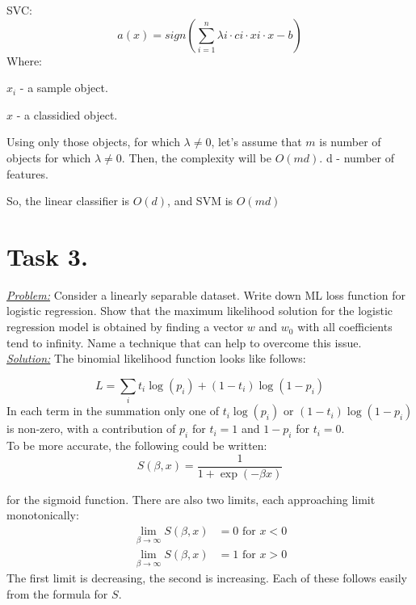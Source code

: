\documentclass[a4paper,12pt]{article}
\begin{document}
SVC:
\[
    a(x) = sign(\sum\limits_{i=1}^{n} \lambda i\cdot ci\cdot xi\cdot x - b)
\]
Where:

\(x_i\) - a sample object.

\(x\) - a classidied object.

Using only those objects, for which \(\lambda \neq 0\), let's assume that \(m\) is number of objects for which \(\lambda \neq 0\). Then, the complexity will be \(O(md)\). d - number of features.

So, the linear classifier is \(O(d)\), and SVM is \(O(md)\)


\newpage
\section*{Task 3.}
\underline{\textit{Problem:}} Consider a linearly separable dataset. Write down ML loss function for logistic regression. Show that
the maximum likelihood solution for the logistic regression model is obtained by finding a vector \(w\) and
\(w_0\) with all coefficients tend to infinity.
Name a technique that can help to overcome this issue.\\
\newline
\underline{\textit{Solution:}} The binomial likelihood function looks like
follows:

\[
    L = \sum_it_i\log(p_i) + (1-t_i)\log(1-p_i)
\]
In each term in the summation only one of \(t_i\log(p_i)\) or
\((1-t_i)\log(1-p_i)\) is non-zero, with a contribution of \(p_i\) for \(t_i =
1\) and \(1-p_i\) for \(t_i = 0\).\\
\newline
To be more accurate, the following could be written:
\[
    S(\beta,x) = \frac{1}{1+\exp(-\beta x)}
\]

for the sigmoid function. There are also two limits, each approaching limit monotonically:
\begin{align}
    \lim_{\beta\rightarrow\infty} S(\beta,x) &= 0 \text{ for  }x < 0\\
    \lim_{\beta\rightarrow\infty} S(\beta,x) &= 1 \text{ for  }x > 0
\end{align}
The first limit is decreasing, the second is increasing. Each of these follows easily from the formula for \(S\).
\end{document}
